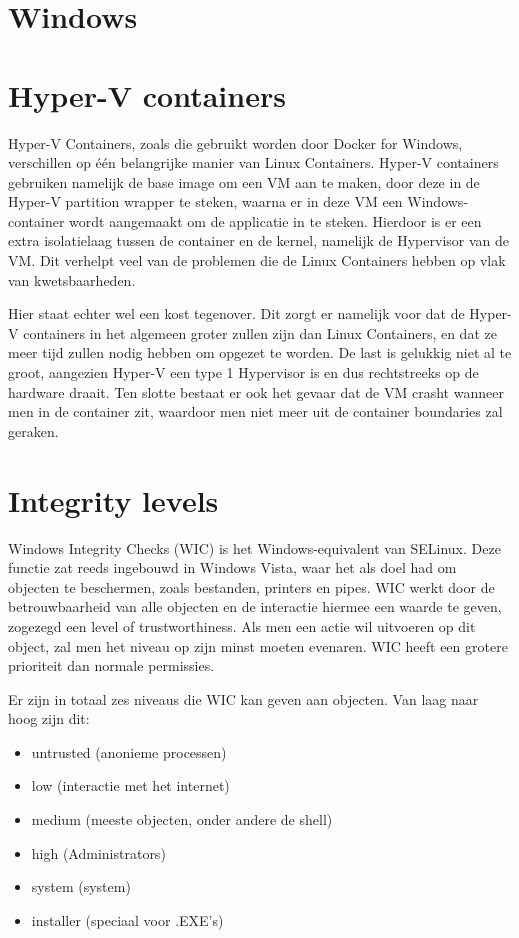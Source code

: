 \section{Windows}
\section{Hyper-V containers}
Hyper-V Containers, zoals die gebruikt worden door Docker for Windows, verschillen op één belangrijke manier van Linux Containers. Hyper-V containers gebruiken namelijk de base image om een VM aan te maken, door deze in de Hyper-V partition wrapper te steken, waarna er in deze VM een Windows-container wordt aangemaakt om de applicatie in te steken. Hierdoor is er een extra isolatielaag tussen de container en de kernel, namelijk de Hypervisor van de VM. Dit verhelpt veel van de problemen die de Linux Containers hebben op vlak van kwetsbaarheden.

Hier staat echter wel een kost tegenover. Dit zorgt er namelijk voor dat de Hyper-V containers in het algemeen groter zullen zijn dan Linux Containers, en dat ze meer tijd zullen nodig hebben om opgezet te worden. De last is gelukkig niet al te groot, aangezien Hyper-V een type 1 Hypervisor is en dus rechtstreeks op de hardware draait. Ten slotte bestaat er ook het gevaar dat de VM crasht wanneer men in de container zit, waardoor men niet meer uit de container boundaries zal geraken. \autocite{Savill2015}

\section{Integrity levels}
Windows Integrity Checks (WIC) is het Windows-equivalent van SELinux. Deze functie zat reeds ingebouwd in Windows Vista, waar het als doel had om objecten te beschermen, zoals bestanden, printers en pipes. WIC werkt door de betrouwbaarheid van alle objecten en de interactie hiermee een waarde te geven, zogezegd een level of trustworthiness. Als men een actie wil uitvoeren op dit object, zal men het niveau op zijn minst moeten evenaren. WIC heeft een grotere prioriteit dan normale permissies.

Er zijn in totaal zes niveaus die WIC kan geven aan objecten. Van laag naar hoog zijn dit:

\begin{itemize}[noitemsep]
	\item untrusted (anonieme processen)
	\item low (interactie met het internet)
	\item medium (meeste objecten, onder andere de shell)
	\item high (Administrators)
	\item system (system)
	\item installer (speciaal voor .EXE's)
\end{itemize}

